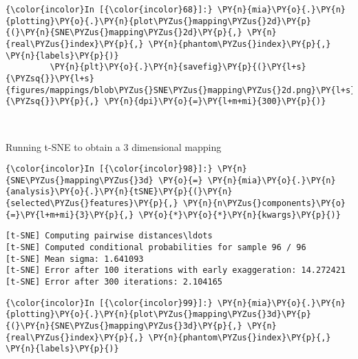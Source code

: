     \begin{Verbatim}[commandchars=\\\{\}]
{\color{incolor}In [{\color{incolor}68}]:} \PY{n}{mia}\PY{o}{.}\PY{n}{plotting}\PY{o}{.}\PY{n}{plot\PYZus{}mapping\PYZus{}2d}\PY{p}{(}\PY{n}{SNE\PYZus{}mapping\PYZus{}2d}\PY{p}{,} \PY{n}{real\PYZus{}index}\PY{p}{,} \PY{n}{phantom\PYZus{}index}\PY{p}{,} \PY{n}{labels}\PY{p}{)}
         \PY{n}{plt}\PY{o}{.}\PY{n}{savefig}\PY{p}{(}\PY{l+s}{\PYZsq{}}\PY{l+s}{figures/mappings/blob\PYZus{}SNE\PYZus{}mapping\PYZus{}2d.png}\PY{l+s}{\PYZsq{}}\PY{p}{,} \PY{n}{dpi}\PY{o}{=}\PY{l+m+mi}{300}\PY{p}{)}
\end{Verbatim}

    \begin{center}
    \end{center}
    { \hspace*{\fill} \\}

    Running t-SNE to obtain a 3 dimensional mapping

    \begin{Verbatim}[commandchars=\\\{\}]
{\color{incolor}In [{\color{incolor}98}]:} \PY{n}{SNE\PYZus{}mapping\PYZus{}3d} \PY{o}{=} \PY{n}{mia}\PY{o}{.}\PY{n}{analysis}\PY{o}{.}\PY{n}{tSNE}\PY{p}{(}\PY{n}{selected\PYZus{}features}\PY{p}{,} \PY{n}{n\PYZus{}components}\PY{o}{=}\PY{l+m+mi}{3}\PY{p}{,} \PY{o}{*}\PY{o}{*}\PY{n}{kwargs}\PY{p}{)}
\end{Verbatim}

    \begin{Verbatim}[commandchars=\\\{\}]
[t-SNE] Computing pairwise distances\ldots
[t-SNE] Computed conditional probabilities for sample 96 / 96
[t-SNE] Mean sigma: 1.641093
[t-SNE] Error after 100 iterations with early exaggeration: 14.272421
[t-SNE] Error after 300 iterations: 2.104165
    \end{Verbatim}

    \begin{Verbatim}[commandchars=\\\{\}]
{\color{incolor}In [{\color{incolor}99}]:} \PY{n}{mia}\PY{o}{.}\PY{n}{plotting}\PY{o}{.}\PY{n}{plot\PYZus{}mapping\PYZus{}3d}\PY{p}{(}\PY{n}{SNE\PYZus{}mapping\PYZus{}3d}\PY{p}{,} \PY{n}{real\PYZus{}index}\PY{p}{,} \PY{n}{phantom\PYZus{}index}\PY{p}{,} \PY{n}{labels}\PY{p}{)}
\end{Verbatim}

